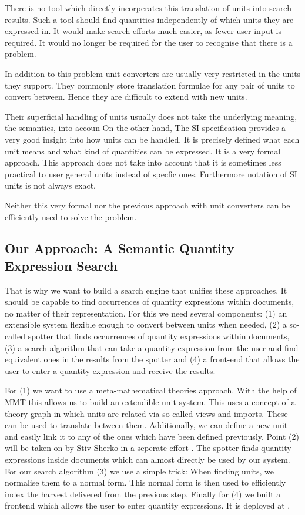 There is no tool which directly incorperates this translation of units into search results. Such a tool should find quantities independently of which units they are expressed in. It would make search efforts much easier, as fewer user input is required. It would no longer be required for the user to recognise that there is a problem.

In addition to this problem unit converters are usually very restricted in the units they support. They commonly store translation formulae for any pair of units to convert between. Hence they are difficult to extend with new units.

Their superficial handling of units usually does not take the underlying meaning, the semantics, into accoun On the other hand, The SI specification \cite{sispec} provides a very good insight into how units can be handled. It is precisely defined what each unit means and what kind of quantities can be expressed. It is a very formal approach. This approach does not take into account that it is sometimes less practical to user general units instead of specfic ones. Furthermore notation of SI units is not always exact.

Neither this very formal nor the previous approach with unit converters can be efficiently used to solve the problem.

\subsection{Our Approach: A Semantic Quantity Expression Search}

That is why we want to build a search engine that unifies these approaches. It should be capable to find occurrences of quantity expressions within documents, no matter of their representation. For this we need several components: (1) an extensible system flexible enough to convert between units when needed, (2) a so-called spotter that finds occurrences of quantity expressions within documents, (3) a search algorithm that can take a quantity expression from the user and find equivalent ones in the results from the spotter and (4) a front-end that allows the user to enter a quantity expression and receive the results.

For (1) we want to use a meta-mathematical theories approach. With the help of MMT this allows us to build an extendible unit system. This uses a concept of a theory graph in which units are related via so-called views and imports. These can be used to translate between them. Additionally, we can define a new unit and easily link it to any of the ones which have been defined previously. Point (2) will be taken on by Stiv Sherko in a seperate effort \cite{thesis:sharko}. The spotter finds quantity expressions inside documents which can almost directly be used by our system. For our search algorithm (3) we use a simple trick: When finding units, we normalise them to a normal form. This normal form is then used to efficiently index the harvest delivered from the previous step. Finally for (4) we built a frontend which allows the user to enter quantity expressions. It is deployed at .

